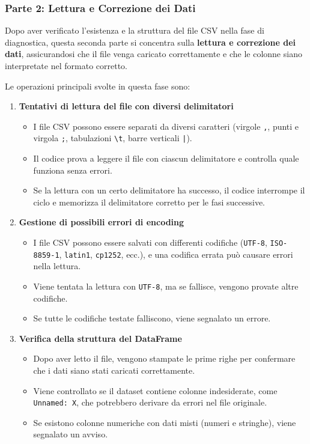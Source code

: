 \documentclass[%
	corpo=11pt,
    twoside,
    stile=classica,
    oldstyle,
    tipotesi=custom,
    greek,
    evenboxes,
]{toptesi}
\begin{document}
\subsubsection{Parte 2: Lettura e Correzione dei Dati}

Dopo aver verificato l'esistenza e la struttura del file CSV nella fase di diagnostica, questa seconda parte si concentra sulla \textbf{lettura e correzione dei dati}, assicurandosi che il file venga caricato correttamente e che le colonne siano interpretate nel formato corretto.

Le operazioni principali svolte in questa fase sono:

\begin{enumerate}
	\item \textbf{Tentativi di lettura del file con diversi delimitatori}
	\begin{itemize}
		\item I file CSV possono essere separati da diversi caratteri (virgole \texttt{,}, punti e virgola \texttt{;}, tabulazioni \texttt{\textbackslash t}, barre verticali \texttt{|}).
		\item Il codice prova a leggere il file con ciascun delimitatore e controlla quale funziona senza errori.
		\item Se la lettura con un certo delimitatore ha successo, il codice interrompe il ciclo e memorizza il delimitatore corretto per le fasi successive.
	\end{itemize}
	
	\item \textbf{Gestione di possibili errori di encoding}
	\begin{itemize}
		\item I file CSV possono essere salvati con differenti codifiche (\texttt{UTF-8}, \texttt{ISO-8859-1}, \texttt{latin1}, \texttt{cp1252}, ecc.), e una codifica errata può causare errori nella lettura.
		\item Viene tentata la lettura con \texttt{UTF-8}, ma se fallisce, vengono provate altre codifiche.
		\item Se tutte le codifiche testate falliscono, viene segnalato un errore.
	\end{itemize}
	
	\item \textbf{Verifica della struttura del DataFrame}
	\begin{itemize}
		\item Dopo aver letto il file, vengono stampate le prime righe per confermare che i dati siano stati caricati correttamente.
		\item Viene controllato se il dataset contiene colonne indesiderate, come \texttt{Unnamed: X}, che potrebbero derivare da errori nel file originale.
		\item Se esistono colonne numeriche con dati misti (numeri e stringhe), viene segnalato un avviso.
	\end{itemize}
	

\end{enumerate}
\end{document}
